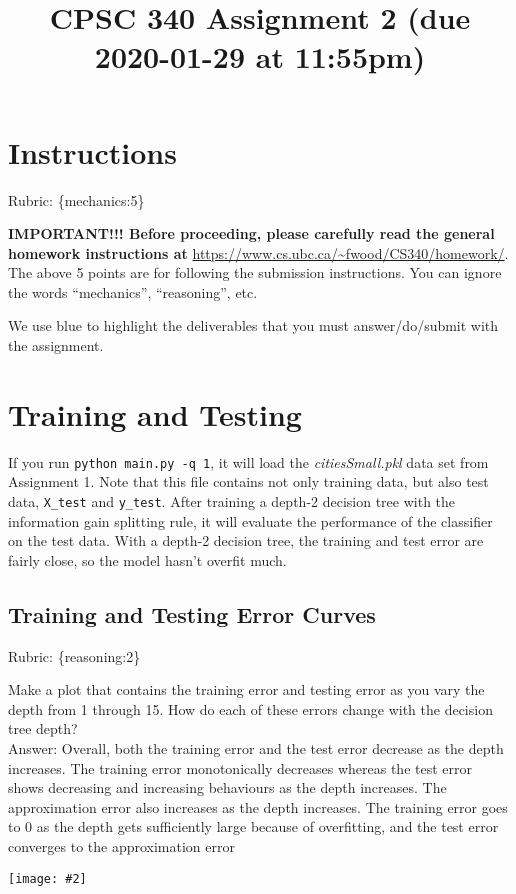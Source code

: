 \documentclass{article}
\def\rubric#1{\gre{Rubric: \{#1\}}}{}
\def\blu#1{{\color{blu}#1}}
\def\gre#1{{\color{gre}#1}}
\newcommand{\centerfig}[2]{\begin{center}\texttt{[image: \#2]}\end{center}}
\def\ans#1{\gre{Answer: #1}}{}
\begin{document}
\title{CPSC 340 Assignment 2 (due 2020-01-29 at 11:55pm)}
\author{}
\date{}
\maketitle
\vspace{-4em}

\section*{Instructions}
\rubric{mechanics:5}

\textbf{IMPORTANT!!! Before proceeding, please carefully read the general homework instructions at} \url{https://www.cs.ubc.ca/~fwood/CS340/homework/}. The above 5 points are for following the submission instructions. You can ignore the words ``mechanics'', ``reasoning'', etc.

\vspace{1em}
We use \blu{blue} to highlight the deliverables that you must answer/do/submit with the assignment.

\section{Training and Testing}
If you run \texttt{python main.py \string-q 1}, it will load the \emph{citiesSmall.pkl} data set from Assignment 1.
Note that this file contains not only training data, but also test data, \texttt{X\string_test} and \texttt{y\string_test}.
After training a depth-2 decision tree with the information gain splitting rule, it will evaluate the performance of the classifier on the test data.
With a depth-2 decision tree, the training and test error are fairly close, so the model hasn't overfit much.

\subsection{Training and Testing Error Curves}
\rubric{reasoning:2}

\blu{Make a plot that contains the training error and testing error as you vary the depth from 1 through 15. How do each of these errors change with the decision tree depth?} \\
\ans{Overall, both the training error and the test error decrease as the depth increases. The training error monotonically decreases whereas the test error shows decreasing and increasing behaviours as the depth increases. The approximation error also increases as the depth increases. The training error goes to $0$ as the depth gets sufficiently large because of overfitting, and the test error converges to the approximation error}
\centerfig{.5}{../figs/q1_training_vs_test_errors.pdf}
\end{document}
